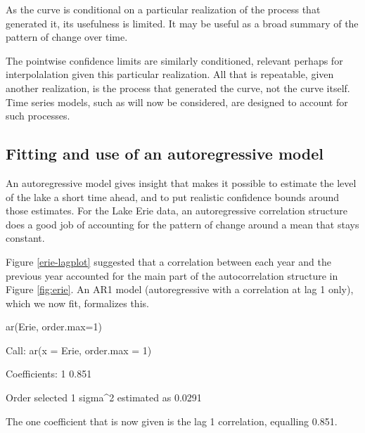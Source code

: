 \documentclass{tufte-book}\usepackage[]{graphicx}\usepackage[]{color}
\begin{document}
\begin{marginfigure}[-5cm]
\begin{Schunk}
\end{Schunk}
\end{marginfigure}

As the curve is conditional on a particular realization of the process
that generated it, its usefulness is limited.  It may be useful as a
broad summary of the pattern of change over time.

The pointwise confidence limits are similarly conditioned, relevant
perhaps for interpolalation given this particular realization.
All that is repeatable, given another realization, is the
process that generated the curve, not the curve itself. Time series
models, such as will now be considered, are designed to account for
such processes.

\subsection{Fitting and use of an autoregressive model}

An autoregressive model gives insight that makes it possible to
estimate the level of the lake a short time ahead, and to put
realistic confidence bounds around those estimates.  For the Lake Erie
data, an autoregressive correlation structure does a good job of
accounting for the pattern of change around a mean that stays
constant.

Figure \ref{erie-lagplot} suggested that a correlation between each
year and the previous year accounted for the main part of the
autocorrelation structure in Figure \ref{fig:erie}. An AR1 model
(autoregressive with a correlation at lag 1 only), which we now fit,
formalizes this.
\begin{Schunk}
\begin{Sinput}
ar(Erie, order.max=1)
\end{Sinput}
\begin{Soutput}

Call:
ar(x = Erie, order.max = 1)

Coefficients:
    1  
0.851  

Order selected 1  sigma^2 estimated as  0.0291
\end{Soutput}
\end{Schunk}
The one coefficient that is now given is the lag 1 correlation,
equalling 0.851.
\end{document}

